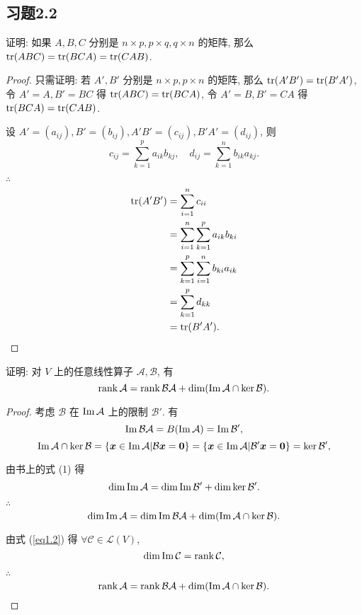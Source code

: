 \documentclass{ctexart}
\begin{document}
\subsection{习题2.2}
\begin{exercise}%
    证明: 如果 $A,B,C$ 分别是 $n\times p,p\times q,q\times n$ 的矩阵, 那么 $\operatorname{tr} (ABC)=\operatorname{tr} (BCA)=\operatorname{tr} (CAB)$.
\end{exercise}
\begin{proof}
    只需证明: 若 $A',B'$ 分别是 $n\times p,p\times n$ 的矩阵, 那么 $\operatorname{tr} (A'B')=\operatorname{tr} (B'A')$, 令 $A'=A,B'=BC$ 得 $\operatorname{tr} (ABC)=\operatorname{tr} (BCA)$, 令 $A'=B,B'=CA$ 得 $\operatorname{tr} (BCA)=\operatorname{tr} (CAB)$.

    设 $A'=(a_{ij}),B'=(b_{ij}),A'B'=(c_{ij}),B'A'=(d_{ij})$, 则
    \[c_{ij}=\sum\limits_{k=1}^pa_{ik}b_{kj},\quad d_{ij}=\sum\limits_{k=1}^nb_{ik}a_{kj}.\]

    $\therefore$
    \begin{align*}
        \operatorname{tr} (A'B') & =\sum\limits_{i=1}^nc_{ii} \\
        & =\sum\limits_{i=1}^n\sum\limits_{k=1}^pa_{ik}b_{ki} \\
        & =\sum\limits_{k=1}^p\sum\limits_{i=1}^nb_{ki}a_{ik} \\
        & =\sum\limits_{k=1}^pd_{kk} \\
        & =\operatorname{tr} (B'A').\qedhere
    \end{align*}
\end{proof}
\addtocounter{exercise}{2}
\begin{exercise}\label{ex2.5}
    证明: 对 $V$ 上的任意线性算子 $\mathcal{A},\mathcal{B}$, 有
    \[\operatorname{rank} \mathcal{A}=\operatorname{rank} \mathcal{BA}+\dim(\operatorname{Im} \mathcal{A}\cap\ker\mathcal{B}).\]
\end{exercise}
\begin{proof}
    考虑 $\mathcal{B}$ 在 $\operatorname{Im} \mathcal{A}$ 上的限制 $\mathcal{B}'$. 有
    \[\operatorname{Im} \mathcal{BA}=B(\operatorname{Im} \mathcal{A})=\operatorname{Im} \mathcal{B}',\]
    \[\operatorname{Im} \mathcal{A}\cap\ker\mathcal{B}=\{\boldsymbol{x}\in\operatorname{Im} \mathcal{A}|\mathcal{B}\boldsymbol{x}=\boldsymbol{0}\}=\{\boldsymbol{x}\in\operatorname{Im} \mathcal{A}|\mathcal{B}'\boldsymbol{x}=\boldsymbol{0}\}=\ker\mathcal{B}',\]

    由书上的式 (1) 得
    \[\dim\operatorname{Im} \mathcal{A}=\dim\operatorname{Im} \mathcal{B}'+\dim\ker\mathcal{B}'.\]

    $\therefore$
    \[\dim\operatorname{Im} \mathcal{A}=\dim\operatorname{Im} \mathcal{BA}+\dim(\operatorname{Im} \mathcal{A}\cap\ker\mathcal{B}).\]

    由式 (\ref{eq1.2}) 得 $\forall\mathcal{C}\in\mathcal{L}(V)$,
    \[\dim\operatorname{Im} \mathcal{C}=\operatorname{rank} \mathcal{C},\]

    $\therefore$
    \[\operatorname{rank} \mathcal{A}=\operatorname{rank} \mathcal{BA}+\dim(\operatorname{Im} \mathcal{A}\cap\ker\mathcal{B}).\qedhere\]
\end{proof}
\end{document}
